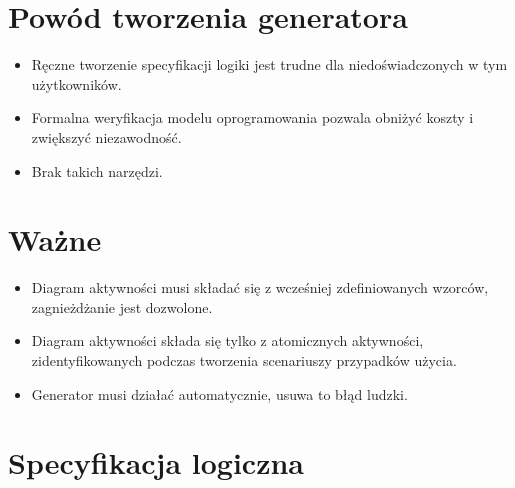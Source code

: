 \documentclass[a4paper, 11pt]{article}
\begin{document}
	\section{Powód tworzenia generatora}
	\begin{itemize}
	\item Ręczne tworzenie specyfikacji logiki jest trudne dla niedoświadczonych w tym użytkowników.
	\item Formalna weryfikacja modelu oprogramowania pozwala obniżyć koszty i zwiększyć niezawodność.
	\item Brak takich narzędzi.
	\end{itemize}
	\section{Ważne}
	\begin{itemize}
	\item Diagram aktywności musi składać się z wcześniej zdefiniowanych wzorców, zagnieżdżanie jest dozwolone.
	\item Diagram aktywności składa się tylko z atomicznych aktywności, zidentyfikowanych podczas tworzenia scenariuszy przypadków użycia.
	\item Generator musi działać automatycznie, usuwa to błąd ludzki.
	\end{itemize}
	\section{Specyfikacja logiczna}
	
\end{document}
